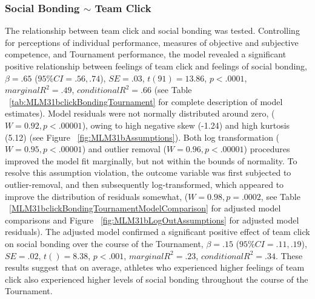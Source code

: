 \documentclass[12pt]{report}
\begin{document}
{\subsubsection{Social Bonding $\sim$ Team Click}
The relationship between team click and social bonding was tested. Controlling for perceptions of individual performance, measures of objective and subjective competence, and Tournament performance, the model revealed a significant positive relationship between feelings of team click and feelings of social bonding, $\beta = .65$ ($95\% CI =  .56, .74$), $SE = .03$, $t(91) = 13.86$, $p < .0001$, $marginal R^2 = .49$, $conditional R^2 = .66$ (see Table ~\ref{tab:MLM31bclickBondingTournament} for complete description of model estimates). Model residuals were not normally distributed around zero, ($W = 0.92, p < .00001$), owing to high negative skew (-1.24) and high kurtosis (5.12) (see Figure ~\ref{fig:MLM31bAssumptions}). Both log transformation ($W = 0.95, p < .00001$) and outlier removal ($W = 0.96, p < .00001$) procedures improved the model fit marginally, but not within the bounds of normality. To resolve this assumption violation, the outcome variable was first subjected to outlier-removal, and then subsequently log-transformed, which appeared to improve the distribution of residuals somewhat, ($W = 0.98, p = .0002$, see Table ~\ref{MLM31bclickBondingTournamentModelComparison} for adjusted model comparisons and Figure ~\ref{fig:MLM31bLogOutAssumptions} for adjusted model residuals).  The adjusted model confirmed a significant positive effect of team click on social bonding over the course of the Tournament, $\beta = .15$ ($95\% CI =  .11, .19$), $SE = .02$, $t() = 8.38$, $p < .001$, $marginal R^2 = .23$, $conditional R^2 = .34$.  These results suggest that on average, athletes who experienced higher feelings of team click also experienced higher levels of social bonding throughout the course of the Tournament.







}
\end{document}
